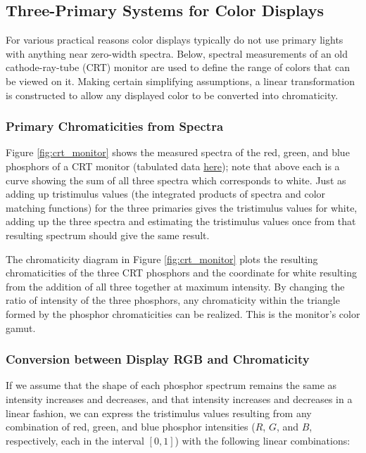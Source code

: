 \documentclass{article}
\begin{document}
\begin{multicols}{2}
\subsection{Three-Primary Systems for Color Displays} %

For various practical reasons color displays typically do not use primary lights with anything near zero-width spectra.  Below, spectral measurements of an old cathode-ray-tube (CRT) monitor are used to define the range of colors that can be viewed on it.  Making certain simplifying assumptions, a linear transformation is constructed to allow any displayed color to be converted into chromaticity.

\subsubsection{Primary Chromaticities from Spectra} %

Figure \ref{fig:crt_monitor} shows the measured spectra of the red, green, and blue phosphors of a CRT monitor (tabulated data \href{https://github.com/kyle-c-mcdermott/visualizing-color-space/blob/main/data/crt_phosphors.csv}{here}); note that above each is a curve showing the sum of all three spectra which corresponds to white.  Just as adding up tristimulus values (the integrated products of spectra and color matching functions) for the three primaries gives the tristimulus values for white, adding up the three spectra and estimating the tristimulus values once from that resulting spectrum should give the same result.

The chromaticity diagram in Figure \ref{fig:crt_monitor} plots the resulting chromaticities of the three CRT phosphors and the coordinate for white resulting from the addition of all three together at maximum intensity.  By changing the ratio of intensity of the three phosphors, any chromaticity within the triangle formed by the phosphor chromaticities can be realized.  This is the monitor's color gamut.

\subsubsection{Conversion between Display RGB and Chromaticity} %

If we assume that the shape of each phosphor spectrum remains the same as intensity increases and decreases, and that intensity increases and decreases in a linear fashion, we can express the tristimulus values resulting from any combination of red, green, and blue phosphor intensities ($R$, $G$, and $B$, respectively, each in the interval $[0,1]$) with the following linear combinations:


\end{multicols}
\end{document}
